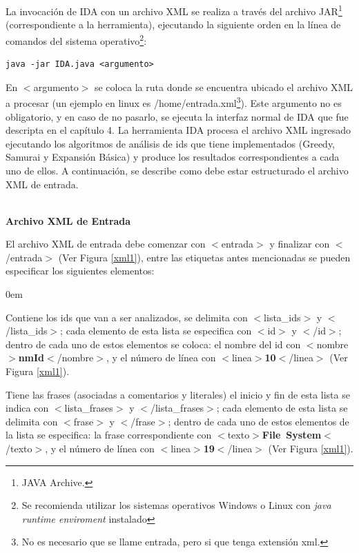 \begin{appendices}
\newpage

La invocación de IDA con un archivo XML se realiza a través del archivo JAR\footnote[1]{JAVA Archive.} (correspondiente a la herramienta), ejecutando la siguiente orden en la línea de comandos del sistema operativo\footnote[2]{Se recomienda utilizar los sistemas operativos Windows o Linux con \textit{java runtime enviroment} instalado}:


\begin{lstlisting}[style=BashInputStyle]
  java -jar IDA.java <argumento>
\end{lstlisting}


En $<$\textsf{argumento}$>$ se coloca la ruta donde se encuentra ubicado el archivo XML a procesar (un ejemplo en linux es \textsf{/home/entrada.xml}\footnote[3]{No es necesario que se llame entrada, pero si que tenga extensión xml.}). Este argumento no es obligatorio, y en caso de no pasarlo, se ejecuta la interfaz normal de IDA que fue descripta en el capítulo 4.
La herramienta IDA procesa el archivo XML ingresado ejecutando los algoritmos de análisis de ids que tiene implementados (Greedy, Samurai y Expansión Básica) y produce los resultados correspondientes a cada uno de ellos.
A continuación, se describe como debe estar estructurado el archivo XML de entrada.

\noindent \textbf{\\Archivo XML de Entrada\\} 

El archivo XML de entrada debe comenzar con \mbox{$<$\textsf{entrada}$>$} y finalizar con \mbox{$<$/\textsf{entrada}$>$} (Ver Figura \ref{xml1}), entre las etiquetas antes mencionadas se pueden especificar los siguientes elementos: 

\begin{description}
\itemsep0em%
\item[Lista de Identificadores:] Contiene los ids que van a ser analizados, se delimita con \mbox{$<$\textsf{lista\_ids}$>$} y \mbox{$<$/\textsf{lista\_ids}$>$}; cada elemento de esta lista se especifica con $<$\textsf{id}$>$ y $<$/\textsf{id}$>$; dentro de cada uno de estos elementos se coloca: el nombre del id con \mbox{$<$\textsf{nombre}$>$\textbf{nmId}$<$/\textsf{nombre}$>$}, y el número de línea con \mbox{$<$\textsf{linea}$>$\textbf{10}$<$/\textsf{linea}$>$} (Ver Figura \ref{xml1}).

\item[Lista de Frases:] Tiene las frases (asociadas a comentarios y literales) el inicio y fin de esta lista se indica con \mbox{$<$\textsf{lista\_frases}$>$} y \mbox{$<$/\textsf{lista\_frases}$>$};
cada elemento de esta lista se delimita con $<$\textsf{frase}$>$ y $<$/\textsf{frase}$>$; dentro de cada uno de estos elementos de la lista se especifica: la frase correspondiente con \mbox{$<$\textsf{texto}$>$\textbf{File System}$<$/\textsf{texto}$>$}, y el número de línea con \mbox{$<$\textsf{linea}$>$\textbf{19}$<$/\textsf{linea}$>$} (Ver Figura \ref{xml1}).


\end{description}
\end{appendices}
